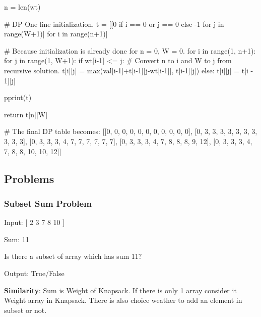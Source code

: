 \documentclass[12pt]{article}
\begin{document}
\begin{python}
    n = len(wt)

    # DP One line initialization.
    t = [[0 if i == 0 or j == 0 else -1 for j in range(W+1)] for i in range(n+1)]

    # Because initialization is already done for n = 0, W = 0.
    for i in range(1, n+1):
        for j in range(1, W+1):
            if wt[i-1] <= j:
                # Convert n to i and W to j from recursive solution.
                t[i][j] = max(val[i-1]+t[i-1][j-wt[i-1]], t[i-1][j])
            else:
                t[i][j] = t[i - 1][j]

            pprint(t)

    return t[n][W]
    
# The final DP table becomes:
[[0, 0, 0, 0, 0, 0, 0, 0, 0, 0, 0],
 [0, 3, 3, 3, 3, 3, 3, 3, 3, 3, 3],
 [0, 3, 3, 3, 4, 7, 7, 7, 7, 7, 7],
 [0, 3, 3, 3, 4, 7, 8, 8, 8, 9, 12],
 [0, 3, 3, 3, 4, 7, 8, 8, 10, 10, 12]]
\end{python}

\subsection{Problems}

\subsubsection{Subset Sum Problem}

Input: [ 2  3  7  8  10 ]

Sum: 11

Is there a subset of array which has sum 11?

Output: True/False

\textbf{Similarity}: Sum is Weight of Knapsack. If there is only 1 array consider it Weight array in Knapsack. There is also choice weather to add an element in subset or not. 
\end{document}

